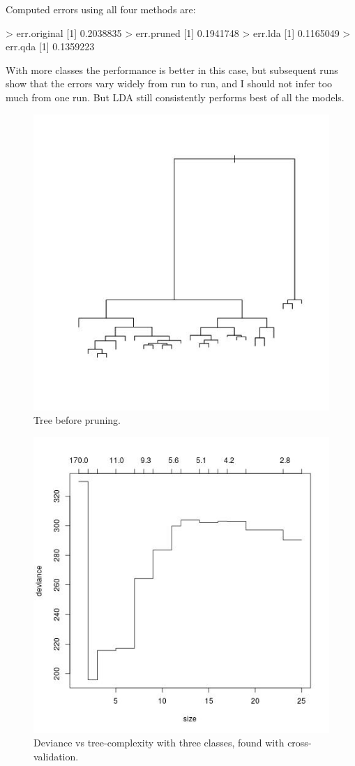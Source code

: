 \documentclass[a4paper, 10pt, english]{article}
\begin{document}
\begin{itemize}
\begin{enumerate}
\begin{minipage}{\textwidth}
		Computed errors using all four methods are:
		\begin{python}
> err.original
[1] 0.2038835
> err.pruned
[1] 0.1941748
> err.lda
[1] 0.1165049
> err.qda
[1] 0.1359223
		\end{python}
		With more classes the performance is better in this case, but subsequent runs
		show that the errors vary widely from run to run, and I should not infer too
		much from one run.
		But LDA still consistently performs best of all the models.
	    \end{minipage}

	    \begin{figure}[H]
		\centering
		\includegraphics[width=0.6\linewidth]{r-script/plots2/unpruned-tree.jpg}
		\caption{Tree before pruning.}
		\label{fig2:tree1}
	    \end{figure}

	    \begin{figure}[H]
		\centering
		\includegraphics[width=0.6\linewidth]{r-script/plots2/deviance.jpg}
		\caption{Deviance vs tree-complexity with three classes, found with cross-validation.}
		\label{fig2:dev1}
	    \end{figure}


\end{enumerate}
\end{itemize}
\end{document}

